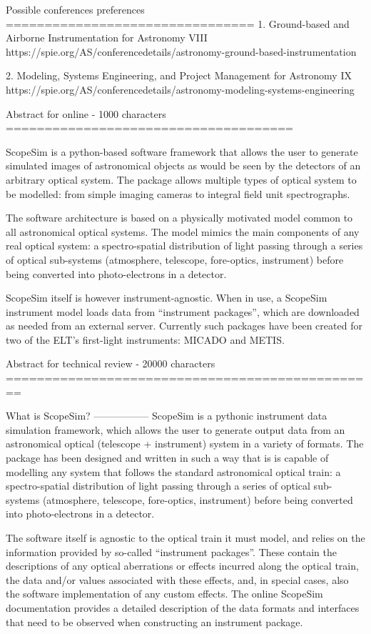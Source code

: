 Possible conferences preferences
================================
1. Ground-based and Airborne Instrumentation for Astronomy VIII
https://spie.org/AS/conferencedetails/astronomy-ground-based-instrumentation

2. Modeling, Systems Engineering, and Project Management for Astronomy IX
https://spie.org/AS/conferencedetails/astronomy-modeling-systems-engineering


Abstract for online - 1000 characters
=====================================

ScopeSim is a python-based software framework that allows the user to generate
simulated images of astronomical objects as would be seen by the detectors of
an arbitrary optical system. The package allows multiple types of optical system
to be modelled: from simple imaging cameras to integral field unit
spectrographs.

The software architecture is based on a physically motivated model common to all
astronomical optical systems. The model mimics the main components of any real
optical system: a spectro-spatial distribution of light passing through a series
of optical sub-systems (atmosphere, telescope, fore-optics, instrument) before
being converted into photo-electrons in a detector.

ScopeSim itself is however instrument-agnostic. When in use, a ScopeSim
instrument model loads data from ``instrument packages'', which are
downloaded as needed from an external server. Currently such packages have been
created for two of the ELT's first-light instruments: MICADO and METIS.


Abstract for technical review - 20000 characters
================================================

What is ScopeSim?
-----------------
ScopeSim is a pythonic instrument data simulation framework, which allows the
user to generate output data from an astronomical optical (telescope +
instrument) system in a variety of formats. The package has been designed and
written in such a way that is is capable of modelling any system that follows
the standard astronomical optical train: a spectro-spatial distribution of light
passing through a series of optical sub-systems (atmosphere, telescope,
fore-optics, instrument) before being converted into photo-electrons in a
detector.

The software itself is agnostic to the optical train it must model, and
relies on the information provided by so-called ``instrument packages''.
These contain the descriptions of any optical aberrations or effects incurred
along the optical train, the data and/or values associated with these
effects, and, in special cases, also the software implementation of any
custom effects. The online ScopeSim documentation provides a detailed
description of the data formats and interfaces that need to be observed when
constructing an instrument package.

